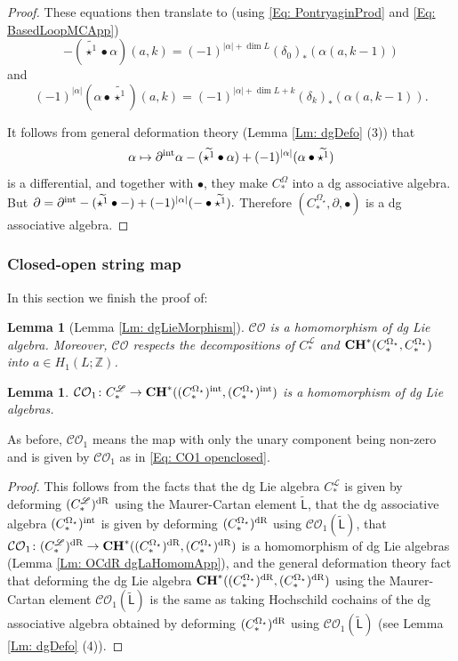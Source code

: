 \documentclass[10pt]{amsart}
\numberwithin{equation}{section}
\theoremstyle{plain}
\newtheorem{lemma}[theorem]{Lemma}
\theoremstyle{definition}
\theoremstyle{remark}
\numberwithin{equation}{section}
\newcommand{\Z}{\mathbb{Z}}
\newcommand{\wt}[1]{\widetilde{#1}}
\newcommand{\dR}{\textup{dR}}
\newcommand{\CO}{\mathcal{CO}}
\newcommand{\CC}{\textbf{\textup{CH}}}
\newcommand{\CFr}{C_*^\mathscr{L}}
\newcommand{\CBa}{C_*^{\Omega_\star}}
\newcommand{\LL}{\textsf{L}}
\begin{document}
{\begin{proof}
	These equations then translate to (using \eqref{Eq: PontryaginProd} and \eqref{Eq: BasedLoopMCApp}) \[-(\wt{\star^1}\bullet \alpha)(a,k) = (-1)^{|\alpha|+\dim L}  (\delta_0)_* (\alpha(a,k-1))  \] and \[ (-1)^{|\alpha|} (\alpha\bullet\wt{\star^1})(a,k) = (-1)^{|\alpha|+\dim L+k} (\delta_k)_* (\alpha(a,k-1)). \]
	

	It follows from general deformation theory (Lemma \ref{Lm: dgDefo} (3)) that 
	\[
		\alpha \mapsto \partial^{\textup{int}}\alpha - (\wt{\star^1}\bullet \alpha) + (-1)^{|\alpha|} (\alpha\bullet \wt{\star^1})
	\]
	is a differential, and together with $\bullet$, they make $C_*^\Omega$ into a dg associative algebra. But $\partial = \partial^{\textup{int}} - (\wt{\star^1}\bullet -) + (-1)^{|\alpha|} (-\bullet \wt{\star^1}).$ Therefore $(\CBa,\partial,\bullet)$ is a dg associative algebra.
\end{proof}







\subsubsection{Closed-open string map}
In this section we finish the proof of:
\begin{lemma}[Lemma \ref{Lm: dgLieMorphism}]\label{Lm: dgLieMorphismApp}
	$\CO$ is a homomorphism of dg Lie algebra.
	Moreover, $\CO$ respects the decompositions of $\CFr$ and $\CC^*(\CBa,\CBa)$ into $a\in H_1(L;\Z)$.
\end{lemma}





\begin{lemma}\label{Lm: COint preserves}
	$\CO_1\colon \CFr\to \CC^*((\CBa)^{\textup{int}}, (\CBa)^{\textup{int}})$ is a homomorphism of dg Lie algebras.
\end{lemma}
As before, $\CO_1$ means the map with only the unary component being non-zero and is given by $\CO_1$ as in \eqref{Eq: CO1 openclosed}.
\begin{proof}
	This follows from the facts that the dg Lie algebra $\CFr$ is given by deforming $(\CFr)^\dR$ using the Maurer-Cartan element $\wt{\LL}$, that the dg associative algebra $(\CBa)^{\textup{int}}$ is given by deforming $(\CBa)^\dR$ using $\CO_1(\wt{\LL})$, that $\CO_1\colon (\CFr)^\dR \to \CC^*((\CBa)^\dR,(\CBa)^\dR)$ is a homomorphism of dg Lie algebras (Lemma \ref{Lm: OCdR dgLaHomomApp}), and the general deformation theory fact that deforming the dg Lie algebra $\CC^*((\CBa)^\dR,(\CBa)^\dR)$ using the Maurer-Cartan element $\CO_1(\wt{\LL})$ is the same as taking Hochschild cochains of the dg associative algebra obtained by deforming $(\CBa)^\dR$ using $\CO_1(\wt{\LL})$ (see Lemma \ref{Lm: dgDefo} (4)).
\end{proof}


}
\end{document}
